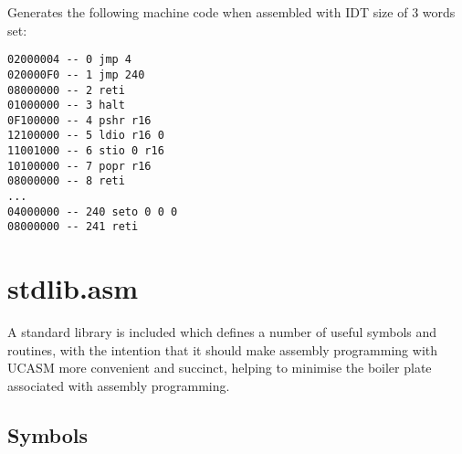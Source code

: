 \documentclass[12pt,twoside]{report}
\begin{document}
\noindent
Generates the following machine code when assembled with IDT size of 3
words set:

\begin{verbatim}
02000004 -- 0 jmp 4
020000F0 -- 1 jmp 240
08000000 -- 2 reti
01000000 -- 3 halt
0F100000 -- 4 pshr r16
12100000 -- 5 ldio r16 0
11001000 -- 6 stio 0 r16
10100000 -- 7 popr r16
08000000 -- 8 reti
...
04000000 -- 240 seto 0 0 0
08000000 -- 241 reti
\end{verbatim}

\newpage
\section{stdlib.asm}

A standard library is included which defines a number of useful
symbols and routines, with the intention that it should make assembly
programming with UCASM more convenient and succinct, helping to
minimise the boiler plate associated with assembly programming.

\subsection{Symbols}
\end{document}
